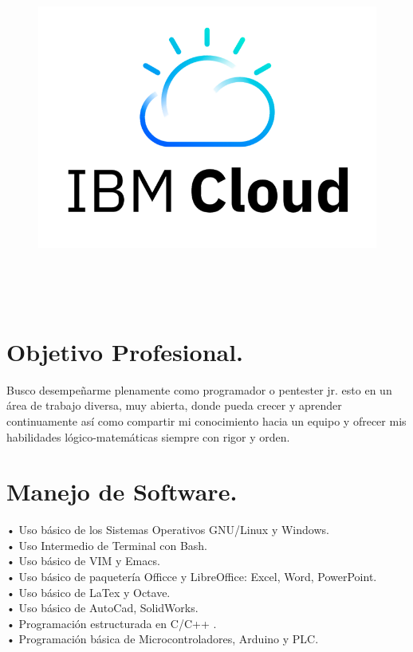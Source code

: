 \documentclass[]{friggeri-cv}
\begin{document}
\begin{aside}
     \begin{figure}
        \centering
     \includegraphics[width=.75\textwidth,center]{ibm.png}
    \end{figure}
    ~
\end{aside}
\\

\section{Objetivo Profesional.}
Busco desempeñarme plenamente como programador o pentester jr. esto en un área de trabajo diversa, muy abierta, donde pueda crecer y aprender continuamente así como compartir mi conocimiento hacia un equipo y ofrecer mis habilidades lógico-matemáticas siempre con rigor y orden.

\section{Manejo de Software.}
• Uso básico de los Sistemas Operativos GNU/Linux y Windows.\\
• Uso Intermedio de Terminal con Bash.\\
• Uso básico de VIM y Emacs.\\
• Uso básico de paquetería Officce y LibreOffice: Excel, Word, PowerPoint.\\
• Uso básico de LaTex y Octave.\\
• Uso básico de AutoCad, SolidWorks.\\
• Programación estructurada en C/C++ .\\
• Programación básica de Microcontroladores, Arduino y PLC.\\
\end{document}
